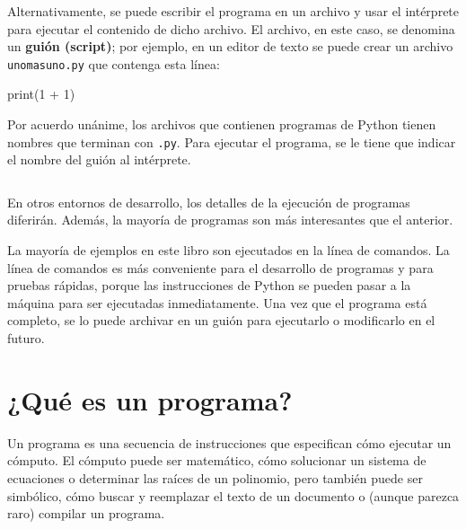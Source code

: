 Alternativamente, se puede escribir el programa en un archivo y usar
el intérprete para ejecutar el contenido de dicho archivo. El archivo,
en este caso, se denomina un \textbf{guión (script)}; por ejemplo,
en un editor de texto se puede crear un archivo \texttt{unomasuno.py}
que contenga esta línea:

\begin{pythoncode}
print(1 + 1)
\end{pythoncode}

Por acuerdo unánime, los archivos que contienen programas de Python
tienen nombres que terminan con \texttt{.py}. Para ejecutar el programa,
se le tiene que indicar el nombre del guión al intérprete.

\begin{verbatim}

\end{verbatim}
En otros entornos de desarrollo, los detalles de la ejecución de programas
diferirán. Además, la mayoría de programas son más interesantes que
el anterior.

La mayoría de ejemplos en este libro son ejecutados en la línea de
comandos. La línea de comandos es más conveniente para el desarrollo
de programas y para pruebas rápidas, porque las instrucciones de Python
se pueden pasar a la máquina para ser ejecutadas inmediatamente. Una
vez que el programa está completo, se lo puede archivar en un guión
para ejecutarlo o modificarlo en el futuro.

\section{¿Qué es un programa?}

Un programa es una secuencia de instrucciones que especifican cómo
ejecutar un cómputo. El cómputo puede ser matemático, cómo solucionar
un sistema de ecuaciones o determinar las raíces de un polinomio,
pero también puede ser simbólico, cómo buscar y reemplazar el texto
de un documento o (aunque parezca raro) compilar un programa.


